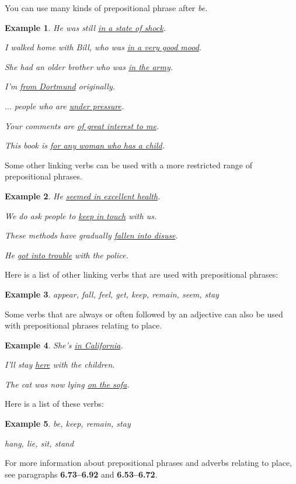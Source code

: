 \documentclass[oneside]{book}
\numberwithin{equation}{section}
\newtheorem{example}{Example}[section]
\begin{document}
%
\noindent{} You can use many kinds of prepositional phrase after \textit{be}.
\begin{example}
    He was still \underline{in a state of shock}.
    
    I walked home with Bill, who was \underline{in a very good mood}.
    
    She had an older brother who was \underline{in the army}.
    
    I'm \underline{from Dortmund} originally.
    
    $\ldots$ people who are \underline{under pressure}.
    
    Your comments are \underline{of great interest to me}.
    
    This book is \underline{for any woman who has a child}.
\end{example}
%
\noindent{} Some other linking verbs can be used with a more restricted range of prepositional phrases.
\begin{example}
    He \underline{seemed in excellent health}.
    
    We do ask people to \underline{keep in touch} with us.
    
    These methods have gradually \underline{fallen into disuse}.
    
    He \underline{got into trouble} with the police.
\end{example}
Here is a list of other linking verbs that are used with prepositional phrases:
\begin{example}
    appear, fall, feel, get, keep, remain, seem, stay
\end{example}
%
\noindent{} Some verbs that are always or often followed by an adjective can also be used with prepositional phrases relating to place.
\begin{example}
    She's \underline{in California}.
    
    I'll stay \underline{here} with the children.
    
    The cat was now lying \underline{on the sofa}.
\end{example}
Here is a list of these verbs:
\begin{example}
    be, keep, remain, stay
    
    hang, lie, sit, stand
\end{example}
For more information about prepositional phrases and adverbs relating to place, see paragraphs \textbf{6.73--6.92} and \textbf{6.53--6.72}.
\end{document}
